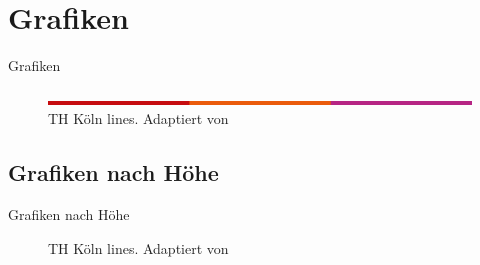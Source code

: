 \documentclass{beamer}
\begin{document}
\section{Grafiken}\label{sec:graphics}
\begin{frame}{Grafiken}
    \begin{figure}\label{thk-linien}
        \includegraphics[width=\textwidth]{figures/thk-lines.png}
        \caption[TH Köln lines]{TH Köln lines. Adaptiert von \cite{source}}
    \end{figure}
\end{frame}

\subsection{Grafiken nach Höhe}\label{sec:graphics_height}
\begin{frame}{Grafiken nach Höhe}
    \begin{figure}\label{thk-linien-hoch}
        \caption[TH Köln lines]{TH Köln lines. Adaptiert von \cite{source}}
    \end{figure}
\end{frame}
\end{document}
